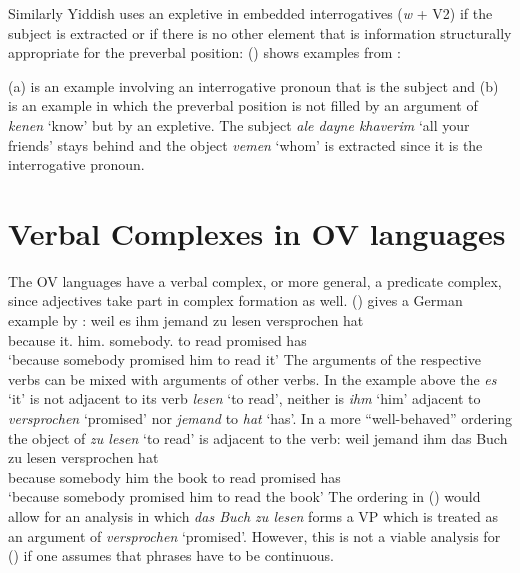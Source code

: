 Similarly Yiddish uses an expletive in embedded interrogatives (\emph{w} + V2) if the subject is
extracted or if there is no other element that is information structurally appropriate for the preverbal position:
() shows examples from \citet{Diesing90a}:

\eal
{}
\zl
(a) is an example involving an interrogative pronoun that is the subject and (b) is an
example in which the preverbal position is not filled by an argument of \emph{kenen} `know' but by
an expletive. The subject \emph{ale dayne khaverim} `all your friends' stays behind and the object
\emph{vemen} `whom' is extracted since it is the interrogative pronoun.



\section{Verbal Complexes in OV languages}


The OV languages have a verbal complex, or more general, a predicate complex, since adjectives take
part in complex formation as well. () gives a German example by :
\ea
\gll weil es ihm jemand zu lesen versprochen hat\\
     because it.\acc{} him.\dat{} somebody.\nom{} to read promised has\\\german
\glt `because somebody promised him to read it'
\z
The arguments of the respective verbs can be mixed with arguments of other verbs. In the example
above the \emph{es} `it' is not adjacent to its verb \emph{lesen} `to read', neither is \emph{ihm}
`him' adjacent to \emph{versprochen} `promised' nor \emph{jemand} to \emph{hat} `has'. In a more
``well-behaved'' ordering the object of \emph{zu lesen} `to read' is adjacent to the verb:
\ea
\gll weil    jemand   ihm das Buch zu lesen versprochen hat\\
     because somebody him the book to read  promised    has\\
\glt `because somebody promised him to read the book'
\z
The ordering in () would allow for an analysis in which \emph{das Buch zu lesen} forms a VP
which is treated as an argument of \emph{versprochen} `promised'. However, this is not a viable
analysis for () if one assumes that phrases have to be continuous.


